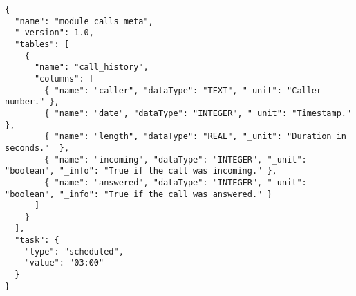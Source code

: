 \begin{lstlisting}[float,
basicstyle=\ttfamily\footnotesize,
caption={Modul definitionen for opkald},label=module:calls]
{
  "name": "module_calls_meta",
  "_version": 1.0,
  "tables": [
    {
      "name": "call_history",
      "columns": [
        { "name": "caller", "dataType": "TEXT", "_unit": "Caller number." },
        { "name": "date", "dataType": "INTEGER", "_unit": "Timestamp." },
        { "name": "length", "dataType": "REAL", "_unit": "Duration in seconds."  },
        { "name": "incoming", "dataType": "INTEGER", "_unit": "boolean", "_info": "True if the call was incoming." },
        { "name": "answered", "dataType": "INTEGER", "_unit": "boolean", "_info": "True if the call was answered." }
      ]
    }
  ],
  "task": {
    "type": "scheduled",
    "value": "03:00"
  }
}
\end{lstlisting}